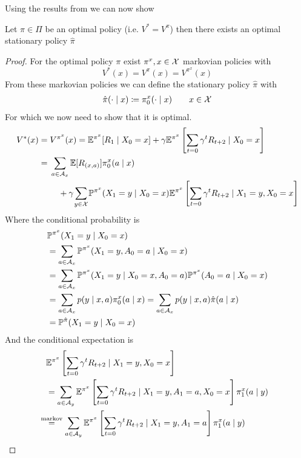 Using the results from \citeauthor{putermanMarkovDecisionProcesses2005} we can now show
\begin{thm}\label{optimal policy => opt stat policy}
	Let \(\pi\in\Pi\) be an optimal policy (i.e. \(V^*=V^\pi\)) then there exists an optimal stationary policy \(\hat{\pi}\)
\end{thm}
\begin{proof}
	For the optimal policy \(\pi\) exist \(\pi^x,x\in\mathcal{X}\) markovian policies with
	\[
		V^*(x)=V^\pi(x)=V^{\pi^x}(x)
	\]
	From these markovian policies we can define the stationary policy \(\hat{\pi}\) with
	\begin{align}
		\hat{\pi}(\cdot\mid x)\coloneqq \pi_0^x(\cdot\mid x) \qquad x\in\mathcal{X}
	\end{align}
	For which we now need to show that it is optimal.
	\begin{align}
		V^*(x)&=V^{\pi^x}(x)=\E^{\pi^x}[R_1\mid X_0=x] 
		+ \gamma \E^{\pi^x}\left[\sum_{t=0}\gamma^t R_{t+2}\mid X_0=x \right] \nonumber\\
		&=\begin{aligned}[t]
			&\sum_{a\in\cA_x}\E[R_{(x,a)}]\pi_0^x(a\mid x)\\
			&\quad + \gamma \smashoperator{\sum_{y\in\cX}}\Pr^{\pi^x}(X_1=y\mid X_0=x)
			\E^{\pi^x}\left[\sum_{t=0}\gamma^t R_{t+2}\mid X_1=y, X_0=x\right]	\label{V^pi^x expanded}
		\end{aligned}
	\end{align}
	Where the conditional probability is
	\begin{align}
		&\mathbb{P}^{\pi^x}(X_1=y\mid X_0=x) \nonumber \\
		&=\sum_{a\in\mathcal{A}_x} \mathbb{P}^{\pi^x}(X_1=y, A_0=a \mid X_0=x) \nonumber\\
		&=\sum_{a\in\mathcal{A}_x} \mathbb{P}^{\pi^x}(X_1=y\mid X_0=x, A_0=a) \mathbb{P}^{\pi^x}(A_0=a\mid X_0=x)\nonumber\\
		&=\sum_{a\in\mathcal{A}_x} p(y\mid x,a) \pi^x_0(a\mid x)
		=\sum_{a\in\mathcal{A}_x} p(y\mid x,a) \hat{\pi}(a\mid x) \nonumber\\
		&=\mathbb{P}^{\hat{\pi}}(X_1=y\mid X_0=x)
	\end{align}
	And the conditional expectation is
	\begin{align}
		&\E^{\pi^x}\left[\sum_{t=0}\gamma^t R_{t+2}\mid X_1=y, X_0=x\right]\nonumber\\
		&=\sum_{a\in\cA_y}
		\E^{\pi^x}\left[\sum_{t=0}\gamma^t R_{t+2}\mid X_1=y, A_1=a, X_0=x\right]\pi^x_1(a\mid y)\nonumber\\
		&\lxeq{\text{markov}} \sum_{a\in\cA_y}
		\E^{\pi^x}\left[\sum_{t=0}\gamma^t R_{t+2}\mid X_1=y, A_1=a\right]\pi^x_1(a\mid y)\nonumber\\

\end{align}
\end{proof}
